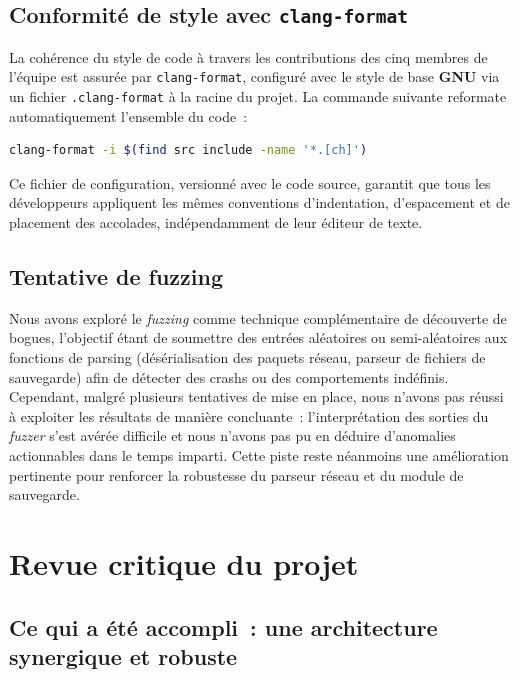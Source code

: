 \documentclass[a4paper]{article}
\begin{document}
\subsection{Conformité de style avec \texttt{clang-format}}
 
La cohérence du style de code à travers les contributions des cinq membres
de l'équipe est assurée par \texttt{clang-format}, configuré avec le style
de base \textbf{GNU} via un fichier \texttt{.clang-format} à la racine du
projet. La commande suivante reformate automatiquement l'ensemble du code~:
 
\begin{lstlisting}[language=bash, caption=Formatage automatique du code]
clang-format -i $(find src include -name '*.[ch]')
\end{lstlisting}
 
Ce fichier de configuration, versionné avec le code source, garantit que
tous les développeurs appliquent les mêmes conventions d'indentation,
d'espacement et de placement des accolades, indépendamment de leur éditeur
de texte.
 

\subsection{Tentative de fuzzing}
 
Nous avons exploré le \textit{fuzzing} comme technique complémentaire de
découverte de bogues, l'objectif étant de soumettre des entrées aléatoires
ou semi-aléatoires aux fonctions de parsing (désérialisation des paquets
réseau, parseur de fichiers de sauvegarde) afin de détecter des crashs ou
des comportements indéfinis. Cependant, malgré plusieurs tentatives de mise
en place, nous n'avons pas réussi à exploiter les résultats de manière
concluante~: l'interprétation des sorties du \textit{fuzzer} s'est avérée
difficile et nous n'avons pas pu en déduire d'anomalies actionnables dans le
temps imparti. Cette piste reste néanmoins une amélioration pertinente pour
renforcer la robustesse du parseur réseau et du module de sauvegarde.
 

\section{Revue critique du projet}
\label{sec:review}

\subsection{Ce qui a été accompli~: une architecture synergique et robuste}
\end{document}
